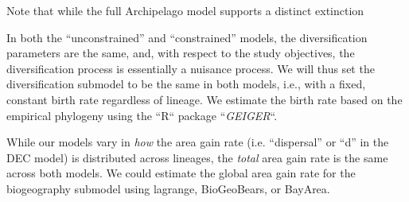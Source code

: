 \documentclass[11pt,openany]{memoir} %
\begin{document}
Note that while the full Archipelago model supports a distinct extinction


In both the ``unconstrained'' and ``constrained'' models, the diversification parameters are the same, and, with respect to the study objectives, the diversification process is essentially a nuisance process.
We will thus set the diversification submodel to be the same in both models, i.e., with a fixed, constant birth rate regardless of lineage.
We estimate the birth rate based on the empirical phylogeny using the ``R`` package ``\textit{GEIGER}``.

While our models vary in \textit{how} the area gain rate (i.e. ``dispersal'' or ``d'' in the DEC model) is distributed across lineages, the \textit{total} area gain rate is the same across both models.
We could estimate the global area gain rate for the biogeography submodel using lagrange, BioGeoBears, or BayArea.
\end{document}
